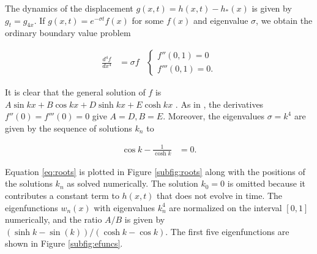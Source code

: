 The dynamics of the displacement $g(x, t) = h(x, t) - h_*(x)$ is given by $g_t = g_{4x}$. 
If $g(x, t) = e^{-\sigma t} f(x)$ for some $f(x)$ and eigenvalue $\sigma$, we obtain the ordinary boundary value problem 

\begin{align}
    \frac{d^4f}{dx^4} &= \sigma f & \begin{cases} f''(0, 1) = 0 \\ f'''(0, 1) = 0. \end{cases} \label{eq:bvp}
\end{align}

It is clear that the general solution of $f$ is $A \sin kx + B \cos kx + D \sinh kx + E \cosh kx$ \citep{landau1986}. 
As in \citet{wiggins1998}, the derivatives $f''(0) = f'''(0) = 0$ give $A = D, B = E$. 
Moreover, the eigenvalues $\sigma = k^4$ are given by the sequence of solutions $k_n$ to 

\begin{align}
    \cos k - \frac{1}{\cosh k} &= 0. \label{eq:roots}
\end{align}

Equation \ref{eq:roots} is plotted in Figure \ref{subfig:roots} along with the positions of the solutions $k_n$ as solved numerically. 
The solution $k_0 = 0$ is omitted because it contributes a constant term to $h(x, t)$ that does not evolve in time. 
The eigenfunctions $w_n(x)$ with eigenvalues $k_n^4$ are normalized on the interval $[0,1]$ numerically, and the ratio $A/B$ is given by $(\sinh k - \sin(k)) / (\cosh k - \cos k)$. 
The first five eigenfunctions are shown in Figure \ref{subfig:efuncs}. 


